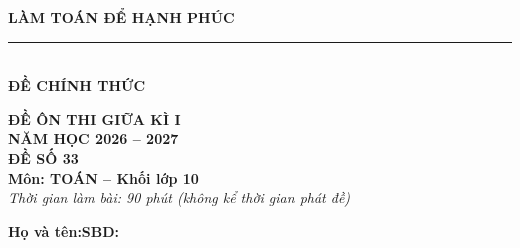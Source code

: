 \documentclass[12pt,a4paper]{article}
\begin{document}
\noindent
\begin{minipage}[c]{0.38\textwidth}
    \centering
    \textbf{LÀM TOÁN ĐỂ HẠNH PHÚC}\\[-2pt]
    \rule{3.2cm}{0.6pt}\\[3pt]
    \textbf{ĐỀ CHÍNH THỨC}
\end{minipage}\hfill
\begin{minipage}[c]{0.35\textwidth}
    \centering
    \textbf{ĐỀ ÔN THI GIỮA KÌ I}\\
    \textbf{NĂM HỌC 2026 -- 2027}\\[2pt]
    \textbf{ĐỀ SỐ 33}\\
    \textbf{Môn: TOÁN -- Khối lớp 10}\\
    \textit{\small Thời gian làm bài: 90 phút (không kể thời gian phát đề)}
\end{minipage}

\vspace{0.03cm}
\noindent
\begin{minipage}[b]{0.78\textwidth}
    \textbf{Họ và tên:}\dotfill\textbf{SBD:}\makebox[3.5cm]{\dotfill}
\end{minipage}\hfill
\begin{minipage}[b]{0.20\textwidth}
    \hfill
    \setlength{\fboxrule}{0.8pt}%
\end{minipage}
\vspace{0.03cm}
\end{document}

